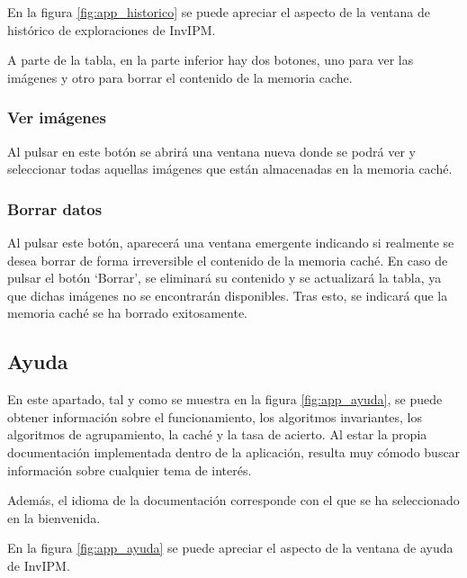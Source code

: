 
En la figura \ref{fig:app_historico} se puede apreciar el aspecto de la ventana de histórico de exploraciones de InvIPM.

A parte de la tabla, en la parte inferior hay dos botones, uno para ver las imágenes y otro para borrar el contenido de la memoria cache. 

\subsubsection{Ver imágenes}\label{ver-imágenes}

Al pulsar en este botón se abrirá una ventana nueva donde se podrá ver y seleccionar todas aquellas imágenes que están almacenadas en la memoria caché.

\subsubsection{Borrar datos}\label{borrar-datos}

Al pulsar este botón, aparecerá una ventana emergente indicando si realmente se desea borrar de forma irreversible el contenido de la memoria caché. En caso de pulsar el botón `Borrar', se eliminará su contenido y se actualizará la tabla, ya que dichas imágenes no se encontrarán disponibles. Tras esto, se indicará que la memoria caché se ha borrado exitosamente.

\subsection{Ayuda}\label{ayuda}

En este apartado, tal y como se muestra en la figura \ref{fig:app_ayuda}, se puede obtener información sobre el funcionamiento, los algoritmos invariantes, los algoritmos de agrupamiento, la caché y la tasa de acierto. Al estar la propia documentación implementada dentro de la aplicación, resulta muy cómodo buscar información sobre cualquier tema de interés. 

Además, el idioma de la documentación corresponde con el que se ha seleccionado en la bienvenida.


En la figura \ref{fig:app_ayuda} se puede apreciar el aspecto de la ventana de ayuda de InvIPM.